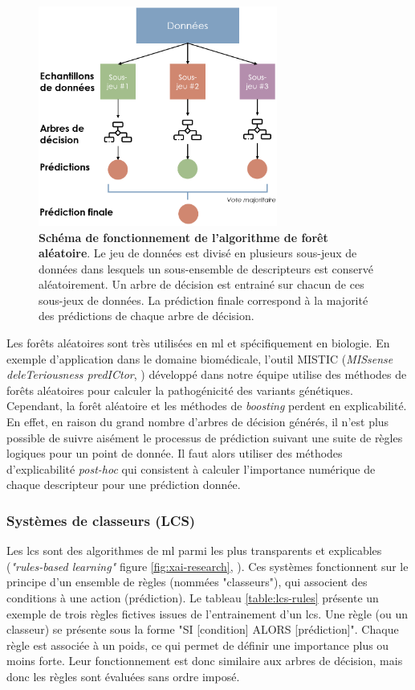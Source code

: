 \begin{figure}[htbp]
 \centering
 \includegraphics[width=0.7\textwidth]{figures/random_forest.png}
 \caption[Schéma de fonctionnement de l'algorithme de forêt aléatoire]{\textbf{Schéma de fonctionnement de l'algorithme de forêt aléatoire}. Le jeu de données est divisé en plusieurs sous-jeux de données dans lesquels un sous-ensemble de descripteurs est conservé aléatoirement. Un arbre de décision est entrainé sur chacun de ces sous-jeux de données. La prédiction finale correspond à la majorité des prédictions de chaque arbre de décision.}
 \label{fig:random-forest}
\end{figure}

Les forêts aléatoires sont très utilisées en \gls{ml} et spécifiquement en biologie. En exemple d'application dans le domaine biomédicale, l'outil MISTIC (\textit{MISsense deleTeriousness predICtor}, \cite{chennen_mistic_2020}) développé dans notre équipe utilise des méthodes de forêts aléatoires pour calculer la pathogénicité des variants génétiques. Cependant, la forêt aléatoire et les méthodes de \textit{boosting} perdent en explicabilité. En effet, en raison du grand nombre d'arbres de décision générés, il n'est plus possible de suivre aisément le processus de prédiction suivant une suite de règles logiques pour un point de donnée. Il faut alors utiliser des méthodes d'explicabilité \textit{post-hoc} qui consistent à calculer l'importance numérique de chaque descripteur pour une prédiction donnée.

\subsubsection{Systèmes de classeurs (LCS)}
Les \gls{lcs} sont des algorithmes de \gls{ml} parmi les plus transparents et explicables (\textit{"rules-based learning"} figure \ref{fig:xai-research}, \cite{arrieta_explainable_2019}). Ces systèmes fonctionnent sur le principe d'un ensemble de règles (nommées "classeurs"), qui associent des conditions à une action (prédiction). Le tableau \ref{table:lcs-rules} présente un exemple de trois règles fictives issues de l'entrainement d'un \gls{lcs}. Une règle (ou un classeur) se présente sous la forme "SI [condition] ALORS [prédiction]". Chaque règle est associée à un poids, ce qui permet de définir une importance plus ou moins forte. Leur fonctionnement est donc similaire aux arbres de décision, mais donc les règles sont évaluées sans ordre imposé.

